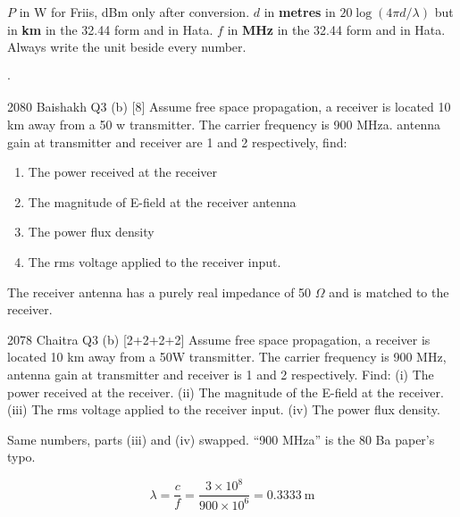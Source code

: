 {\color{sub}\footnotesize {}
$P$ in W for Friis, dBm only after conversion. $d$ in \textbf{metres} in
$20\log(4\pi d/\lambda)$ but in \textbf{km} in the 32.44 form and in Hata. $f$ in
\textbf{MHz} in the 32.44 form and in Hata. Always write the unit beside every number.}

\hr

{\color{sub}\footnotesize {}  \gap$\cdot$\gap {}}

\begin{asked}{2080 Baishakh \textperiodcentered{} Q3 (b) \textperiodcentered{} [8]}
Assume free space propagation, a receiver is located 10 km away from a 50 w transmitter. The
carrier frequency is 900 MHza. antenna gain at transmitter and receiver are 1 and 2
respectively, find:
\begin{enumerate}[label=\roman*), leftmargin=1.9em]
  \item The power received at the receiver
  \item The magnitude of E-field at the receiver antenna
  \item The power flux density
  \item The rms voltage applied to the receiver input.
\end{enumerate}
\par\vspace{1pt}
The receiver antenna has a purely real impedance of 50 $\Omega$ and is matched to the receiver.
\end{asked}
\begin{asked}{2078 Chaitra \textperiodcentered{} Q3 (b) \textperiodcentered{} [2+2+2+2]}
Assume free space propagation, a receiver is located 10 km away from a 50W transmitter. The
carrier frequency is 900 MHz, antenna gain at transmitter and receiver is 1 and 2 respectively.
Find: (i) The power received at the receiver. (ii) The magnitude of the E-field at the
receiver. (iii) The rms voltage applied to the receiver input. (iv) The power flux density.
\par\vspace{1pt}
{\color{sub}Same numbers, parts (iii) and (iv) swapped. ``900 MHza'' is the 80 Ba paper's typo.}
\end{asked}

\[ \lambda = \frac{c}{f} = \frac{3\times10^{8}}{900\times10^{6}} = 0.3333\ \text{m} \]

